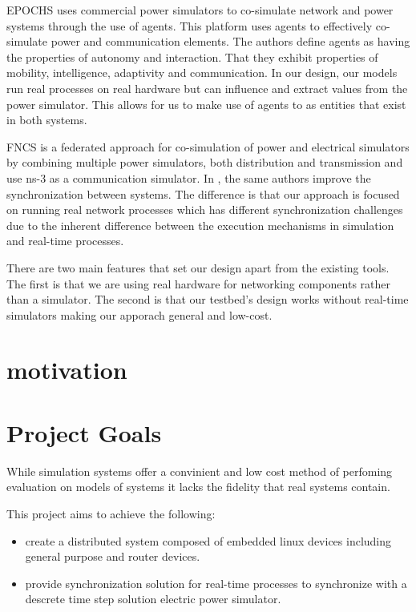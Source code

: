 EPOCHS \cite{EPOCHS} uses commercial power simulators to co-simulate network and power systems through the use of agents.
This platform uses agents to effectively co-simulate power and communication elements.
The authors define agents as having the properties of autonomy and interaction.
That they exhibit properties of mobility, intelligence, adaptivity and communication.
In our design, our models run real processes on real hardware but can influence and extract values from the power simulator.
This allows for us to make use of agents to as entities that exist in both systems.

FNCS \cite{FNCS} is a federated approach for co-simulation of power and electrical simulators by combining multiple power simulators, both distribution and transmission and use ns-3 as a communication simulator.
In \cite{FNCS-algos}, the same authors improve the synchronization between systems.
The difference is that our approach is focused on running real network processes which has different synchronization challenges due to the inherent difference between the execution mechanisms in simulation and real-time processes.

There are two main features that set our design apart from the existing tools.
The first is that we are using real hardware for networking components rather than a simulator.
The second is that our testbed's design works without real-time simulators making our apporach general and low-cost.



\section{motivation}
\label{motivation}
\fi


\section{Project Goals}

While simulation systems offer a convinient and low cost method of perfoming evaluation on models of systems it lacks the fidelity that real systems contain.

This project aims to achieve the following:
\begin{itemize}  
  \item create a distributed system composed of embedded linux devices including general purpose and router devices.
  \item provide synchronization solution for real-time processes to synchronize with a descrete time step solution electric power simulator.
\end{itemize}


